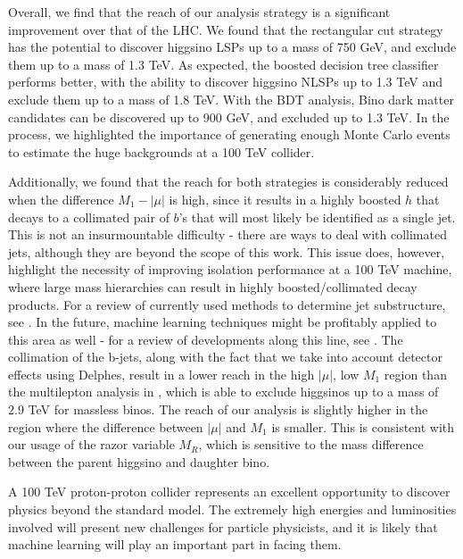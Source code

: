 Overall, we find that the reach of our analysis strategy is a significant improvement over that of the LHC. We found that the rectangular cut strategy has the potential to discover higgsino LSPs up to a mass of 750 GeV, and exclude them up to a mass of 1.3 TeV. As expected, the boosted decision tree classifier performs better, with the ability to discover higgsino NLSPs up to 1.3 TeV and exclude them up to a mass of 1.8 TeV. With the BDT analysis, Bino dark matter candidates can be discovered up to 900 GeV, and excluded up to 1.3 TeV. In the process, we highlighted the importance of generating enough Monte Carlo events to estimate the huge backgrounds at a 100 TeV collider. 

Additionally, we found that the reach for both strategies is considerably reduced when the difference $M_1 - |\mu|$ is high, since it results in a highly boosted $h$ that decays to a collimated pair of $b$'s that will most likely be identified as a single jet. This is not an insurmountable difficulty - there are ways to deal with collimated jets, although they are beyond the scope of this work. This issue does, however, highlight the necessity of improving isolation performance at a 100 TeV machine, where large mass hierarchies can result in highly boosted/collimated decay products. For a review of currently used methods to determine jet substructure, see \citep{Shelton:2013an}. In the future, machine learning techniques might be profitably applied to this area as well - for a review of developments along this line, see \citep{Schwartzman:2016jqu}. The collimation of the b-jets, along with the fact that we take into account detector effects using Delphes, result in a lower reach in the high $|\mu|$, low $M_1$ region than the multilepton analysis in \citep{Gori:2014oua}, which is able to exclude higgsinos up to a mass of 2.9 TeV for massless binos. The reach of our analysis is slightly higher in the region where the difference between $|\mu|$ and $M_1$ is smaller. This is consistent with our usage of the razor variable $M_R$, which is sensitive to the mass difference between the parent higgsino and daughter bino.

A 100 TeV proton-proton collider represents an excellent opportunity to discover physics beyond the standard model. The extremely high energies and luminosities involved will present new challenges for particle physicists, and it is likely that machine learning will play an important part in facing them. 
